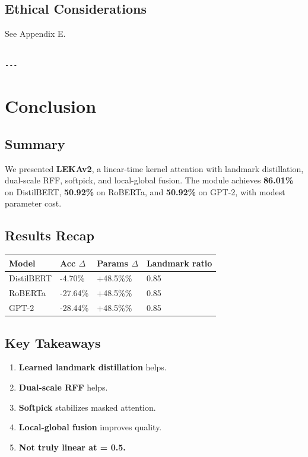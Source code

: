 \subsection{Ethical Considerations}

See Appendix E.
\begin{lstlisting}

---
\end{lstlisting}

\section{Conclusion}

\subsection{Summary}

We presented \textbf{LEKAv2}, a linear-time kernel attention with landmark 
distillation, dual-scale RFF, softpick, and local-global fusion. The 
module achieves \textbf{86.01\%} on DistilBERT, \textbf{50.92\%} on RoBERTa, 
and \textbf{50.92\%} on GPT-2, with modest parameter cost.

\subsection{Results Recap}

\begin{table}[H]
\centering
\small
\begin{tabular}{llll}
\toprule
\textbf{Model} & \textbf{Acc $\Delta$} & \textbf{Params $\Delta$} & \textbf{Landmark ratio} \\
\midrule
DistilBERT & -4.70\% & +48.5\%\% & 0.85 \\
RoBERTa & -27.64\% & +48.5\%\% & 0.85 \\
GPT-2 & -28.44\% & +48.5\%\% & 0.85 \\
\bottomrule
\end{tabular}
\end{table}

\subsection{Key Takeaways}

\begin{enumerate}
\item \textbf{Learned landmark distillation} helps.
\item \textbf{Dual-scale RFF} helps.
\item \textbf{Softpick} stabilizes masked attention.
\item \textbf{Local-global fusion} improves quality.
\item \textbf{Not truly linear at   = 0.5.}

\end{enumerate}
